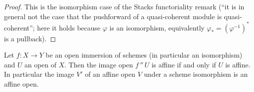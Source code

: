 \begin{proof}
  This is the isomorphism case of the Stacks functoriality remark (``it is in general not the case that
  the pushforward of a quasi-coherent module is quasi-coherent''; here it holds because \(\varphi\) is an
  isomorphism, equivalently \(\varphi_* = (\varphi^{-1})^*\) is a pullback).
\end{proof}

\begin{lemma}
  \label{mk-lem:isAffineOpen_image_of_iso_mathlib}
  \mathlibok

  Let \(f : X \to Y\) be an open immersion of schemes (in particular an isomorphism) and \(U\) an open
  of \(X\). Then the image open \(f \,{''}\, U\) is affine if and only if \(U\) is affine. In
  particular the image \(V'\) of an affine open \(V\) under a scheme isomorphism is an affine open.
\end{lemma}

